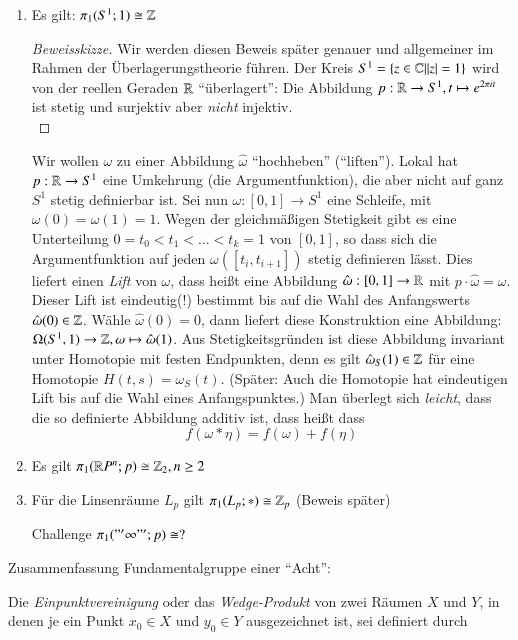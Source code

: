\documentclass[a4paper,10pt]{scrartcl}
\newcommand{\homo}{\cong}
\begin{document}
\begin{exs*}
\begin{enumerate}[(1)]
\item Es gilt: $\pi_1(S^1; 1)\homo \Z$
\begin{proof}[Beweisskizze]
Wir werden diesen Beweis später genauer und allgemeiner im Rahmen der Überlagerungstheorie führen. Der Kreis $S^1=\{ z\in \mathbb{C}| |z|=1\}$ wird von der reellen Geraden $\mathbb{R}$ "`überlagert"': Die Abbildung $p:  \mathbb{R}\to S^1, t\mapsto e^{2\pi i t}$ ist stetig und surjektiv aber \emph{nicht} injektiv.\\
\fixme[fig61]
\end{proof}
Wir wollen $\omega$ zu einer Abbildung $\hat\omega$ "`hochheben"' ("`liften"'). Lokal hat $p: \mathbb{R}  \to S^1$ eine Umkehrung (die Argumentfunktion), die aber nicht auf ganz $S^1$ stetig definierbar ist. Sei nun $\omega: [0,1]\to S^1$ eine Schleife, mit $\omega(0)=\omega(1)=1$. Wegen der gleichmäßigen Stetigkeit gibt es eine Unterteilung $0=t_0<t_1<...<t_k=1$ von $[0,1]$, so dass sich  die Argumentfunktion auf jeden $\omega([t_i, t_{i+1}])$ stetig definieren lässt. Dies liefert einen \emph{Lift} von $\omega$, dass heißt eine Abbildung $\hat \omega: [0,1]\to \mathbb{R}$ mit $p \cdot \hat \omega=\omega$. Dieser Lift ist eindeutig(!) bestimmt bis auf die Wahl des Anfangswerts $\hat \omega(0) \in \mathbb{Z}$. Wähle $\hat \omega(0)=0$, dann liefert diese Konstruktion eine Abbildung: $\Omega(S^1, 1)\to \mathbb{Z}, \omega \mapsto \hat \omega(1)$. Aus Stetigkeitsgründen ist diese Abbildung invariant unter Homotopie mit festen Endpunkten, denn es gilt $\hat \omega_S(1)\in \mathbb{Z}$ für eine Homotopie $H(t,s)=\omega_S(t)$. (Später: Auch die Homotopie hat eindeutigen Lift bis auf die Wahl eines Anfangspunktes.) Man überlegt sich \emph{leicht}, dass die so definierte Abbildung additiv ist, dass heißt dass
\[
 f(\omega*\eta)=f(\omega)+f(\eta)
\]
\item Es gilt $\pi_1(\R P^n; p)\homo \Z_2, n\ge 2$
\item Für die Linsenräume $L_p$ gilt $\pi_1(L_p;*)\homo \Z_p$ (Beweis später)
\begin{seg}{Challenge}
\fixme[fig62]
$\pi_1("'\infty"'; p) \homo ?$
\end{seg}
 \end{enumerate}
\end{exs*}
\begin{seg}{Zusammenfassung}
 Fundamentalgruppe einer "`Acht"':
\fixme[fig63]
\end{seg}
Die \emph{Einpunktvereinigung} oder das \emph{Wedge-Produkt} von zwei Räumen $X$ und $Y$, in denen je ein Punkt $x_0 \in X$ und $y_0\in Y$ ausgezeichnet ist, sei definiert durch 
\end{document}
